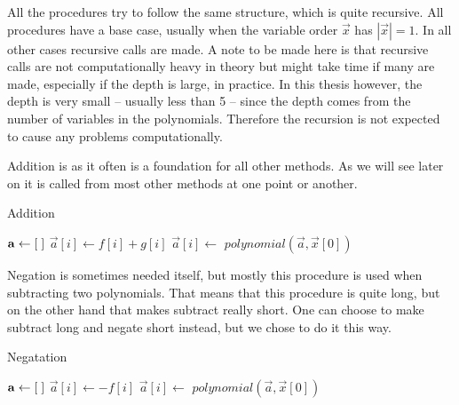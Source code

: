 All the procedures try to follow the same structure, which is quite recursive. All procedures have a base case, usually when the variable order $\vec{x}$ has $|\vec{x}|=1$. In all other cases recursive calls are made. A note to be made here is that recursive calls are not computationally heavy in theory but might take time if many are made, especially if the depth is large, in practice. In this thesis however, the depth is very small -- usually less than 5 -- since the depth comes from the number of variables in the polynomials. Therefore the recursion is not expected to cause any problems computationally.

Addition is as it often is a foundation for all other methods. As we will see later on it is called from most other methods at one point or another.
\begin{algorithm}[H]
  \caption{Addition}
  \begin{algorithmic}[1]
      \State $\mathbf{a}\gets [\hspace*{1mm}]$
          \State $\vec{a}[i]\gets f[i]+g[i]$
        \Else
          \State $\vec{a}[i]\gets$ 
        \EndIf
      \EndFor
      \State \Return $polynomial(\vec{a},\vec{x}[0])$
    \EndProcedure
  \end{algorithmic}
\end{algorithm}

Negation is sometimes needed itself, but mostly this procedure is used when subtracting two polynomials. That means that this procedure is quite long, but on the other hand that makes subtract really short. One can choose to make subtract long and negate short instead, but we chose to do it this way.
\begin{algorithm}[H]
  \caption{Negatation}
  \begin{algorithmic}[1]
      \State $\mathbf{a}\gets [\hspace*{1mm}]$
          \State $\vec{a}[i]\gets -f[i]$
        \Else
          \State $\vec{a}[i]\gets$ 
        \EndIf
      \EndFor
      \State \Return $polynomial(\vec{a},\vec{x}[0])$
    \EndProcedure
  \end{algorithmic}
\end{algorithm}

